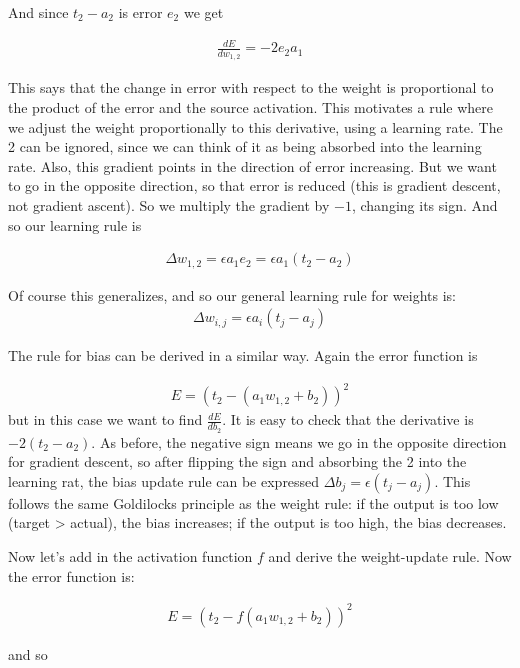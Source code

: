 And since $t_2 -  a_2$ is error $e_2$ we get

\begin{eqnarray*}
\frac{dE}{dw_{1,2}} = -2 e_2 a_1
\end{eqnarray*}

This says that the change in error with respect to the weight is proportional to the product of the error and the source activation. This motivates a rule where we adjust the weight proportionally to this derivative, using a learning rate. The 2 can be ignored, since we can think of it as being absorbed into the learning rate. Also, this gradient points in the direction of error increasing. But we want to go in the opposite direction, so that error is reduced (this is gradient descent, not gradient ascent). So we multiply the gradient by $-1$, changing its sign. And so our learning rule is 

\begin{eqnarray*}
\Delta w_{1,2}  =  \epsilon a_1 e_2  = \epsilon a_1 (t_2 - a_2)
\end{eqnarray*} 

Of course this generalizes, and so our general learning rule for weights is:
\begin{eqnarray*}
\Delta w_{i,j}  =  \epsilon a_i (t_j - a_j)
\end{eqnarray*} 

The rule for bias can be derived in a similar way. Again the error function is

\begin{eqnarray*}
E =  (t_2 - ( a_1 w_{1,2} + b_2))^2 
\end{eqnarray*}
but in this case we want to find $\frac{dE}{db_{2}}$. It is easy to check that the derivative is $-2(t_2 - a_2)$. As before, the negative sign means we go in the opposite direction for gradient descent, so after flipping the sign and absorbing the 2 into the learning rat, the bias update rule can be expressed $\Delta b_j = \epsilon (t_j - a_j)$. This follows the same Goldilocks principle as the weight rule: if the output is too low (target > actual), the bias increases; if the output is too high, the bias decreases.

Now let's add in the activation function $f$ and derive the weight-update rule. Now the error function is:

\begin{eqnarray*}
E =  (t_2 - f(a_1w_{1,2} + b_2))^2   
\end{eqnarray*}

and so

